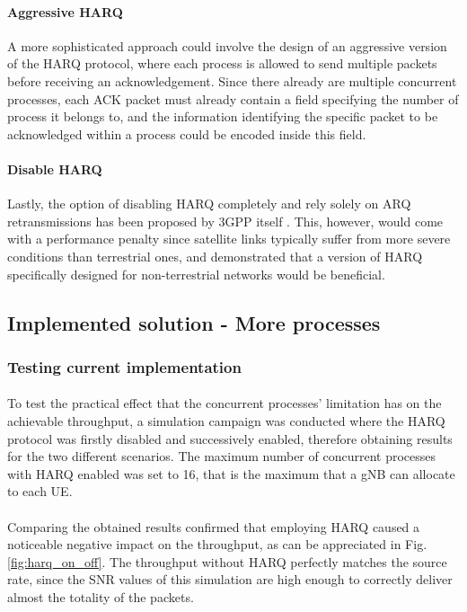 \paragraph{Aggressive HARQ}
A more sophisticated approach could involve the design of an aggressive version of the \ac{HARQ} protocol, where each process is allowed to send multiple packets before receiving an acknowledgement. Since there already are multiple concurrent processes, each \ac{ACK} packet must already contain a field specifying the number of process it belongs to, and the information identifying the specific packet to be acknowledged within a process could be encoded inside this field.
\paragraph{Disable \ac{HARQ}}
Lastly, the option of disabling \ac{HARQ} completely and rely solely on \ac{ARQ} retransmissions has been proposed by 3GPP itself \cite{hybrid-arq-schemes-muk}. This, however, would come with a performance penalty since satellite links typically suffer from more severe conditions than terrestrial ones, and \cite{5g-beyond-5g-ntn-trends-vanellicoralli} demonstrated that a version of \ac{HARQ} specifically designed for non-terrestrial networks would be beneficial.

\subsection{Implemented solution - More processes}
\subsubsection{Testing current implementation}
\paragraph{}
To test the practical effect that the concurrent processes' limitation has on the achievable throughput, a simulation campaign was conducted where the \ac{HARQ} protocol was firstly disabled and successively enabled, therefore obtaining results for the two different scenarios. The maximum number of concurrent processes with \ac{HARQ} enabled was set to 16, that is the maximum that a \ac{gNB} can allocate to each \ac{UE}.

\paragraph{}
Comparing the obtained results confirmed that employing \ac{HARQ} caused a noticeable negative impact on the throughput, as can be appreciated in Fig. \ref{fig:harq_on_off}. The throughput without \ac{HARQ} perfectly matches the source rate, since the \ac{SNR} values of this simulation are high enough to correctly deliver almost the totality of the packets. 

